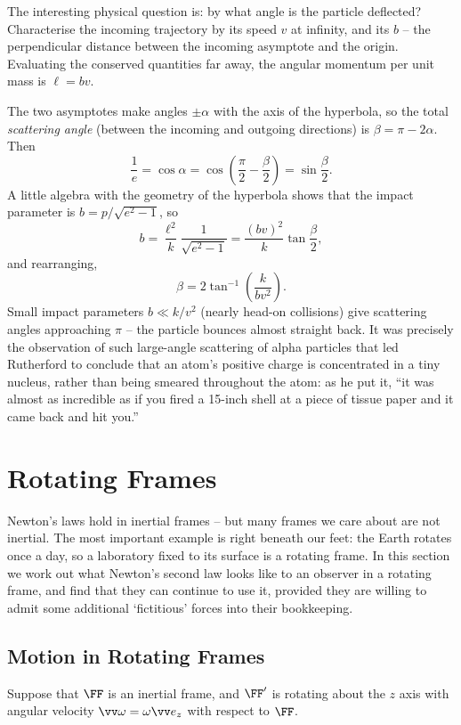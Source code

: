 The interesting physical question is: by what angle is the particle deflected? Characterise the incoming trajectory by its speed $v$ at infinity, and its  $b$ -- the perpendicular distance between the incoming asymptote and the origin. Evaluating the conserved quantities far away, the angular momentum per unit mass is $\ell = bv$.

The two asymptotes make angles $\pm \alpha$ with the axis of the hyperbola, so the total \emph{scattering angle} (between the incoming and outgoing directions) is $\beta = \pi - 2\alpha$. Then
$$
\frac{1}{e} = \cos \alpha = \cos\left(\frac{\pi}{2} - \frac{\beta}{2}\right) = \sin \frac{\beta}{2}.
$$
A little algebra with the geometry of the hyperbola shows that the impact parameter is $b = p/\sqrt{e^2 - 1}$, so
$$
b = \frac{\ell^2}{k}\frac{1}{\sqrt{e^2 - 1}} = \frac{(bv)^2}{k} \tan \frac{\beta}{2},
$$
and rearranging,
$$
\beta = 2 \tan^{-1}\left(\frac{k}{b v^2}\right).
$$
Small impact parameters $b \ll k/v^2$ (nearly head-on collisions) give scattering angles approaching $\pi$ -- the particle bounces almost straight back. It was precisely the observation of such large-angle scattering of alpha particles that led Rutherford to conclude that an atom's positive charge is concentrated in a tiny nucleus, rather than being smeared throughout the atom: as he put it, ``it was almost as incredible as if you fired a 15-inch shell at a piece of tissue paper and it came back and hit you.''
\section{Rotating Frames} \label{sec:rotating}

Newton's laws hold in inertial frames -- but many frames we care about are not inertial. The most important example is right beneath our feet: the Earth rotates once a day, so a laboratory fixed to its surface is a rotating frame. In this section we work out what Newton's second law looks like to an observer in a rotating frame, and find that they can continue to use it, provided they are willing to admit some additional `fictitious' forces into their bookkeeping.

\subsection{Motion in Rotating Frames}

Suppose that $\FF$ is an inertial frame, and $\FF'$ is rotating about the $z$ axis with angular velocity $\vv \omega = \omega \vv e_z$ with respect to $\FF$.


